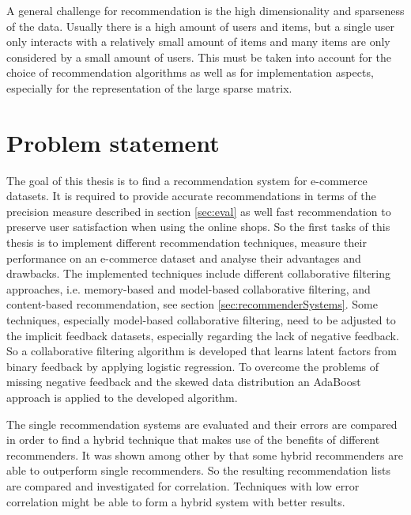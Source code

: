 \documentclass[10pt]{reportMaster}
\begin{document}
A general challenge for recommendation is the high dimensionality and sparseness of the data.
Usually there is a high amount of users and items, but a single user only interacts with a relatively small amount of items and many items are only considered by a small amount of users.
This must be taken into account for the choice of recommendation algorithms as well as for implementation aspects, especially for the representation of the large sparse matrix.


\section{Problem statement}
The goal of this thesis is to find a recommendation system for e-commerce datasets.
It is required to provide accurate recommendations in terms of the precision measure described in section \ref{sec:eval} as well fast recommendation to preserve user satisfaction when using the online shops.
So the first tasks of this thesis is to implement different recommendation techniques, measure their performance on an e-commerce dataset and analyse their advantages and drawbacks.
The implemented techniques include different collaborative filtering approaches, i.e. memory-based and model-based collaborative filtering, and content-based recommendation, see section \ref{sec:recommenderSystems}.
Some techniques, especially model-based collaborative filtering, need to be adjusted to the implicit feedback datasets, especially regarding the lack of negative feedback.
So a collaborative filtering algorithm is developed that learns latent factors from binary feedback by applying logistic regression.
To overcome the problems of missing negative feedback and the skewed data distribution an AdaBoost approach is applied to the developed algorithm.

The single recommendation systems are evaluated and their errors are compared in order to find a hybrid technique that makes use of the benefits of different recommenders.
It was shown among other by \cite{hybridSurvey} that some hybrid recommenders are able to outperform single recommenders. %
So the resulting recommendation lists are compared and investigated for correlation.
Techniques with low error correlation might be able to form a hybrid system with better results.
\end{document}
